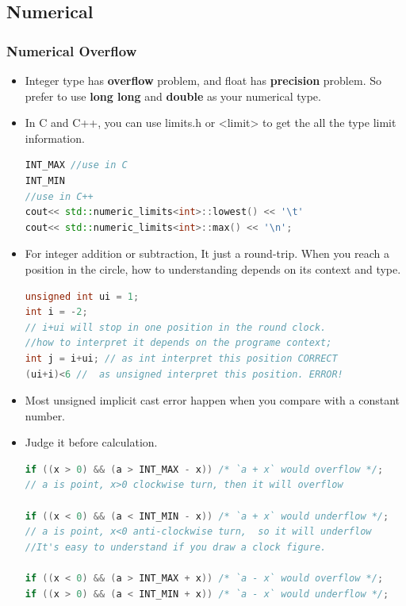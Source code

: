 \documentclass[a4paper,12pt,twoside]{book}
\begin{document}
\subsection{Numerical}
\subsubsection{Numerical Overflow}

\begin{itemize}
\item Integer type has \textbf{overflow} problem, and float has \textbf{precision} problem. So prefer to use \textbf{long long} and \textbf{double} as your numerical type.

\item In C and C++, you can use limits.h or <limit> to get the all the type limit information.
\begin{lstlisting}[frame=single, language=c++]
INT_MAX //use in C
INT_MIN
//use in C++
cout<< std::numeric_limits<int>::lowest() << '\t'
cout<< std::numeric_limits<int>::max() << '\n';
\end{lstlisting}

\item For integer addition or subtraction, It just a round-trip. When you reach a position in the circle, how to understanding depends on its context and type.

\begin{lstlisting}[frame=single, language=c++]
unsigned int ui = 1;
int i = -2;
// i+ui will stop in one position in the round clock.
//how to interpret it depends on the programe context;
int j = i+ui; // as int interpret this position CORRECT
(ui+i)<6 //  as unsigned interpret this position. ERROR!
\end{lstlisting}

\item Most unsigned implicit cast error happen when you compare with a constant number. 

\item  Judge it before calculation.
\begin{lstlisting}[frame=single, language=c++]
if ((x > 0) && (a > INT_MAX - x)) /* `a + x` would overflow */;
// a is point, x>0 clockwise turn, then it will overflow

if ((x < 0) && (a < INT_MIN - x)) /* `a + x` would underflow */;
// a is point, x<0 anti-clockwise turn,  so it will underflow
//It's easy to understand if you draw a clock figure.

if ((x < 0) && (a > INT_MAX + x)) /* `a - x` would overflow */;
if ((x > 0) && (a < INT_MIN + x)) /* `a - x` would underflow */;


\end{lstlisting}
\end{itemize}
\end{document}

